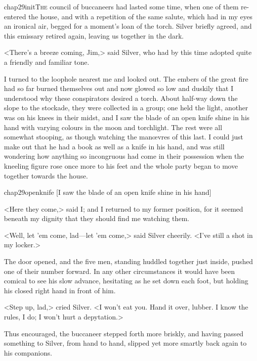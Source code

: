 
\lettrine{chap29initT}{he} council of buccaneers had lasted some time, when one of them re-entered the house, and with a repetition of the same salute, which had in my eyes an ironical air, begged for a moment's loan of the torch. Silver briefly agreed, and this emissary retired again, leaving us together in the dark.

<There's a breeze coming, Jim,> said Silver, who had by this time adopted quite a friendly and familiar tone.

I turned to the loophole nearest me and looked out. The embers of the great fire had so far burned themselves out and now glowed so low and duskily that I understood why these conspirators desired a torch. About half-way down the slope to the stockade, they were collected in a group; one held the light, another was on his knees in their midst, and I saw the blade of an open knife shine in his hand with varying colours in the moon and torchlight. The rest were all somewhat stooping, as though watching the manœvres of this last. I could just make out that he had a book as well as a knife in his hand, and was still wondering how anything so incongruous had come in their possession when the kneeling figure rose once more to his feet and the whole party began to move together towards the house.

\begin{bwbigpic}
	[\basicscale]
	{chap29openknife}
	[I saw the blade of an open knife shine in his hand]
\end{bwbigpic}

<Here they come,> said I; and I returned to my former position, for it seemed beneath my dignity that they should find me watching them.

<Well, let 'em come, lad—let 'em come,> said Silver cheerily. <I've still a shot in my locker.>

The door opened, and the five men, standing huddled together just inside, pushed one of their number forward. In any other circumstances it would have been comical to see his slow advance, hesitating as he set down each foot, but holding his closed right hand in front of him.

<Step up, lad,> cried Silver. <I won't eat you. Hand it over, lubber. I know the rules, I do; I won't hurt a depytation.>

Thus encouraged, the buccaneer stepped forth more briskly, and having passed something to Silver, from hand to hand, slipped yet more smartly back again to his companions.

